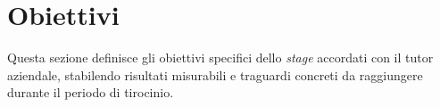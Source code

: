 \section{Obiettivi}
Questa sezione definisce gli obiettivi specifici dello \textit{stage} accordati con il tutor aziendale, stabilendo risultati misurabili e traguardi concreti da raggiungere durante il periodo di tirocinio.